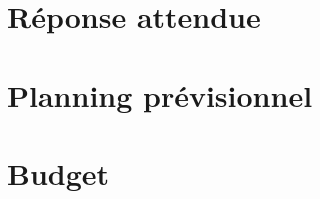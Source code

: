 \documentclass[oneside]{report}
\begin{document}
	\chapter{Réponse attendue}
	{
	
	}

	\chapter{Planning prévisionnel}
	{
	
	}

	\chapter{Budget}
	{
		
	}
\end{document}
